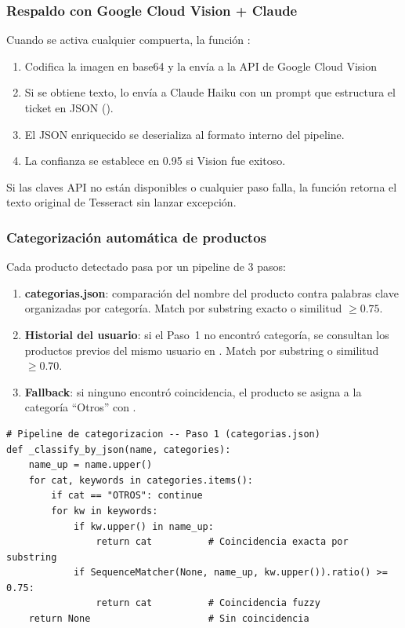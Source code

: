 \subsubsection*{Respaldo con Google Cloud Vision + Claude}

Cuando se activa cualquier compuerta, la función
:

\begin{enumerate}
  \item Codifica la imagen en base64 y la envía a la API de Google Cloud
        Vision
  \item Si se obtiene texto, lo envía a Claude Haiku con un prompt que
        estructura el ticket en JSON
        ().
  \item El JSON enriquecido se deserializa al formato interno del pipeline.
  \item La confianza se establece en 0.95 si Vision fue exitoso.
\end{enumerate}

Si las claves API no están disponibles o cualquier paso falla, la función
retorna el texto original de Tesseract sin lanzar excepción.

\subsubsection*{Categorización automática de productos}

Cada producto detectado pasa por un pipeline de 3 pasos:

\begin{enumerate}
  \item \textbf{categorias.json}: comparación del nombre del producto
        contra palabras clave organizadas por categoría. Match por
        substring exacto o similitud 
        $\geq 0.75$.
  \item \textbf{Historial del usuario}: si el Paso~1 no encontró
        categoría, se consultan los productos previos del mismo usuario
        en . Match por substring o similitud
        $\geq 0.70$.
  \item \textbf{Fallback}: si ninguno encontró coincidencia, el producto
        se asigna a la categoría ``Otros'' con
        .
\end{enumerate}

\begin{lstlisting}[style=python,
    caption={Pipeline de categorización de productos — Paso 1}]
# Pipeline de categorizacion -- Paso 1 (categorias.json)
def _classify_by_json(name, categories):
    name_up = name.upper()
    for cat, keywords in categories.items():
        if cat == "OTROS": continue
        for kw in keywords:
            if kw.upper() in name_up:
                return cat          # Coincidencia exacta por substring
            if SequenceMatcher(None, name_up, kw.upper()).ratio() >= 0.75:
                return cat          # Coincidencia fuzzy
    return None                     # Sin coincidencia
\end{lstlisting}

